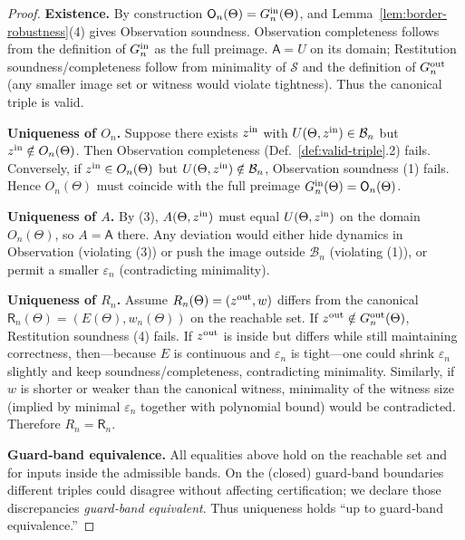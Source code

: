 \documentclass[12pt]{article}
\begin{document}
\begin{proof}
\textbf{Existence.}  By construction $\mathsf O_n(\Theta)=G^{\rm in}_n(\Theta)$, and Lemma~\ref{lem:border-robustness}(4) gives Observation soundness.  Observation completeness follows from the definition of $G^{\rm in}_n$ as the full preimage.  $\mathsf A=U$ on its domain; Restitution soundness/completeness follow from minimality of $\mathcal S$ and the definition of $G^{\rm out}_n$ (any smaller image set or witness would violate tightness).  Thus the canonical triple is valid.

\smallskip
\textbf{Uniqueness of $O_n$.}  
Suppose there exists $z^{\rm in}$ with $U(\Theta,z^{\rm in})\in\mathcal B_n$ but $z^{\rm in}\notin O_n(\Theta)$.  Then Observation completeness (Def.~\ref{def:valid-triple}.2) fails.  Conversely, if $z^{\rm in}\in O_n(\Theta)$ but $U(\Theta,z^{\rm in})\notin\mathcal B_n$, Observation soundness (1) fails.  Hence $O_n(\Theta)$ must coincide with the full preimage $G^{\rm in}_n(\Theta)=\mathsf O_n(\Theta)$.

\smallskip
\textbf{Uniqueness of $A$.}  
By (3), $A(\Theta,z^{\rm in})$ must equal $U(\Theta,z^{\rm in})$ on the domain $O_n(\Theta)$, so $A=\mathsf A$ there.  Any deviation would either hide dynamics in Observation (violating (3)) or push the image outside $\mathcal B_n$ (violating (1)), or permit a smaller $\varepsilon_n$ (contradicting minimality).

\smallskip
\textbf{Uniqueness of $R_n$.}  
Assume $R_n(\Theta)=(z^{\rm out},w)$ differs from the canonical $\mathsf R_n(\Theta)=(E(\Theta),w_n(\Theta))$ on the reachable set.  If $z^{\rm out}\notin G^{\rm out}_n(\Theta)$, Restitution soundness (4) fails.  If $z^{\rm out}$ is inside but differs while still maintaining correctness, then—because $E$ is continuous and $\varepsilon_n$ is tight—one could shrink $\varepsilon_n$ slightly and keep soundness/completeness, contradicting minimality.  Similarly, if $w$ is shorter or weaker than the canonical witness, minimality of the witness size (implied by minimal $\varepsilon_n$ together with polynomial bound) would be contradicted.  Therefore $R_n=\mathsf R_n$.

\smallskip
\textbf{Guard‑band equivalence.}  
All equalities above hold on the reachable set and for inputs inside the admissible bands.  On the (closed) guard‑band boundaries different triples could disagree without affecting certification; we declare those discrepancies \emph{guard‑band equivalent}.  Thus uniqueness holds “up to guard‑band equivalence.”
\end{proof}
\end{document}
